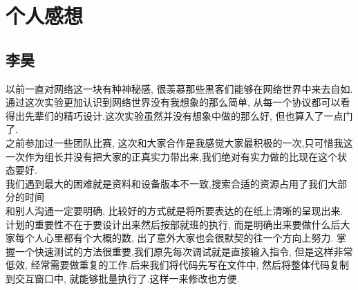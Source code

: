 \section{个人感想}
\addtocounter{section}{1}
	\subsection*{李昊}
	以前一直对网络这一块有种神秘感, 很羡慕那些黑客们能够在网络世界中来去自如.通过这次实验更加认识到网络世界没有我想象的那么简单, 从每一个协议都可以看得出先辈们的精巧设计.这次实验虽然并没有想象中做的那么好, 但也算入了一点门了.\\
\indent	之前参加过一些团队比赛, 这次和大家合作是我感觉大家最积极的一次,只可惜我这一次作为组长并没有把大家的正真实力带出来,我们绝对有实力做的比现在这个状态要好.\\
\indent	我们遇到最大的困难就是资料和设备版本不一致,搜索合适的资源占用了我们大部分的时间\\
\indent	和别人沟通一定要明确, 比较好的方式就是将所要表达的在纸上清晰的呈现出来.\\
\indent	计划的重要性不在于要设计出来然后按部就班的执行, 而是明确出来要做什么后大家每个人心里都有个大概的数, 出了意外大家也会很默契的往一个方向上努力.
\indent 掌握一个快速测试的方法很重要,我们原先每次调试就是直接输入指令, 但是这样非常低效, 经常需要做重复的工作.后来我们将代码先写在文件中, 然后将整体代码复制到交互窗口中, 就能够批量执行了.这样一来修改也方便.
